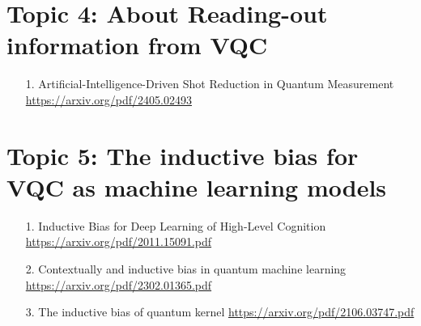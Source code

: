 \documentclass[12pt, oneside]{article}   	%
\begin{document}
\section{Topic 4: About Reading-out information  from VQC}
\begin{itemize}
	\item [1. ] Artificial-Intelligence-Driven Shot Reduction in Quantum Measurement \url{https://arxiv.org/pdf/2405.02493}
\end{itemize}

\section{Topic 5: The inductive bias for VQC as machine learning models}
\begin{itemize}
\item[1. ] Inductive Bias for Deep Learning of High-Level Cognition \url{https://arxiv.org/pdf/2011.15091.pdf}
\item[2. ] Contextually and inductive bias in quantum machine learning \url{https://arxiv.org/pdf/2302.01365.pdf}
\item[3. ] The inductive bias of quantum kernel \url{https://arxiv.org/pdf/2106.03747.pdf}
\end{itemize}
\end{document}
